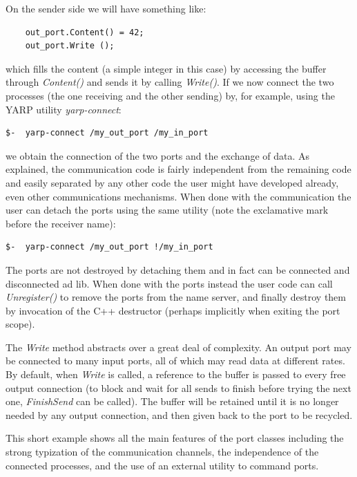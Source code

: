 On the sender side we will have something 
like:
%
\begin{verbatim}
    out_port.Content() = 42;
    out_port.Write ();
\end{verbatim}
%
\noindent which fills the content (a simple integer in this case) by
accessing the buffer through {\em Content()} and sends it by calling
{\em Write()}.
%
%
If we now connect the two processes (the one receiving
and the other sending) by, for example, using the YARP utility {\em yarp-connect}:

\begin{verbatim}
$-  yarp-connect /my_out_port /my_in_port    
\end{verbatim}

\noindent we obtain the connection of the two ports and the exchange of data. As explained,
the communication code is fairly independent from the remaining code and easily separated
by any other code the user might have developed already, even other communications 
mechanisms. When done with the communication the user can detach the ports using the same
utility (note the exclamative mark before the receiver name):

\begin{verbatim}
$-  yarp-connect /my_out_port !/my_in_port 
\end{verbatim}

The ports are not destroyed by detaching them and in fact can be connected and disconnected
ad lib. When done with the ports instead the user code can call {\em Unregister()} to 
remove the ports from the name server, and finally destroy them by invocation of the C++
destructor (perhaps implicitly when exiting the port scope).

The {\em Write} method abstracts over a great deal of complexity.
An output port may be connected to many input ports, all of which
may read data at different rates.  By default, when {\em Write}
is called, a reference to the buffer is passed to
every free output connection (to block and wait for all sends to finish before trying the next one, {\em FinishSend} can be called).  The buffer will be retained
until it is no longer needed by any output connection, and then
given back to the port to be recycled.  %

This short example shows all the main features of the port classes including the strong
typization of the communication channels, the independence of the connected processes, and
the use of an external utility to command ports.



